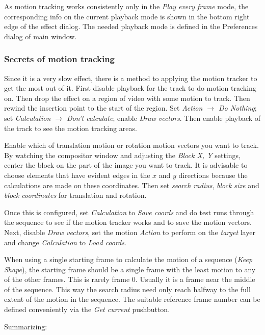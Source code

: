 As motion tracking works consistently only in the \textit{Play every frame} mode,
the corresponding info on the current playback mode is shown in the bottom
right edge of the effect dialog.  The needed playback mode is defined in the
Preferences dialog of \CGG{} main window.

\subsubsection*{Secrets of motion tracking}
\label{ssub:secrets_motion_tracking}

Since it is a very slow effect, there is a method to applying the motion tracker to get the most out of it. First disable playback for the track to do motion tracking on. Then drop the effect on a region of video with some motion to track. Then rewind the insertion point to the start of the region. Set \textit{Action $\rightarrow$ Do Nothing}; set \textit{Calculation $\rightarrow$ Don't calculate}; enable \textit{Draw vectors}. Then enable playback of the track to see the motion tracking areas.

Enable which of translation motion or rotation motion vectors you want to track. By watching the compositor window and adjusting the \textit{Block X, Y} settings, center the block on the part of the image you want to track. It is advisable to choose elements that have evident edges in the $x$ and $y$ directions because the calculations are made on these coordinates. Then set \textit{search radius}, \textit{block size} and \textit{block coordinates} for translation and rotation.

Once this is configured, set \textit{Calculation} to \textit{Save coords} and do test runs through the sequence to see if the motion tracker works and to save the motion vectors. Next, disable \textit{Draw vectors}, set the motion \textit{Action} to perform on the \textit{target} layer and change \textit{Calculation} to \textit{Load coords}.

When using a single starting frame to calculate the motion of a sequence (\textit{Keep Shape}), the starting frame should be a single frame with the least motion to any of the other frames. This is rarely frame $0$. Usually it is a frame near the middle of the sequence. This way the search radius need only reach halfway to the full extent of the motion in the sequence. The suitable reference frame number can be defined conveniently via the \textit{Get current} pushbutton.

Summarizing:

